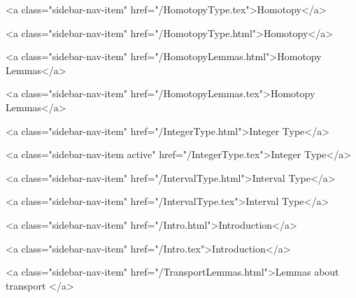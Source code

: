       
        
          <a class="sidebar-nav-item" href="/HomotopyType.tex">Homotopy</a>
        
      
    
      
        
          <a class="sidebar-nav-item" href="/HomotopyType.html">Homotopy</a>
        
      
    
      
        
          <a class="sidebar-nav-item" href="/HomotopyLemmas.html">Homotopy Lemmas</a>
        
      
    
      
        
          <a class="sidebar-nav-item" href="/HomotopyLemmas.tex">Homotopy Lemmas</a>
        
      
    
      
        
          <a class="sidebar-nav-item" href="/IntegerType.html">Integer Type</a>
        
      
    
      
        
          <a class="sidebar-nav-item active" href="/IntegerType.tex">Integer Type</a>
        
      
    
      
        
          <a class="sidebar-nav-item" href="/IntervalType.html">Interval Type</a>
        
      
    
      
        
          <a class="sidebar-nav-item" href="/IntervalType.tex">Interval Type</a>
        
      
    
      
        
          <a class="sidebar-nav-item" href="/Intro.html">Introduction</a>
        
      
    
      
        
          <a class="sidebar-nav-item" href="/Intro.tex">Introduction</a>
        
      
    
      
        
          <a class="sidebar-nav-item" href="/TransportLemmas.html">Lemmas about transport </a>
        
      
    
